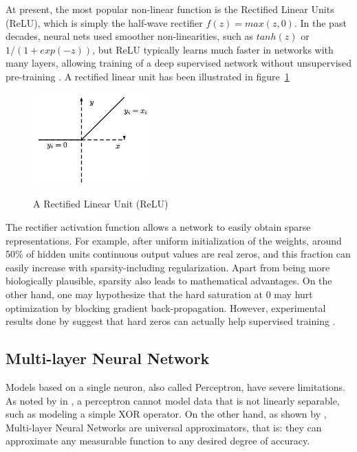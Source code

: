 \indent At present, the most popular non-linear function is the Rectified Linear Units (ReLU), which is simply the half-wave rectifier $f(z) = max(z, 0)$. In the past decades, neural nets used smoother non-linearities, such as $tanh(z)$ or $1/(1+ exp(-z))$, but ReLU typically learns much faster in networks with many layers, allowing training of a deep supervised network without unsupervised pre-training \cite{lecun2015deep}. A rectified linear unit has been illustrated in figure~\ref{fig:relu}

\begin{figure}[H]
	\centering
	{\includegraphics[width=0.4\textwidth]{images/relu}}
	\caption{A Rectified Linear Unit (ReLU)}
	\label{fig:relu}
\end{figure}

\indent The rectifier activation function allows a network to easily obtain sparse representations. For example, after uniform initialization of the weights, around 50\% of hidden units continuous output values are real zeros, and this fraction can easily increase with sparsity-including regularization. Apart from being more biologically plausible, sparsity also leads to mathematical advantages. On the other hand, one may hypothesize that the hard saturation at 0 may hurt optimization by blocking gradient back-propagation. However, experimental results done by \citeauthor{glorot2011deep} suggest that hard zeros can actually help supervised training \cite{glorot2011deep}.  


\subsection{Multi-layer Neural Network}

Models based on a single neuron, also called Perceptron, have severe limitations. As noted by \citeauthor{preparata2012computational} in \cite{preparata2012computational}, a perceptron cannot model data that is not linearly separable, such as modeling a simple XOR operator. On the other hand, as shown by \citet{hornik1989multilayer}, Multi-layer Neural Networks are universal approximators, that is: they can approximate any measurable function to any desired degree of accuracy.


